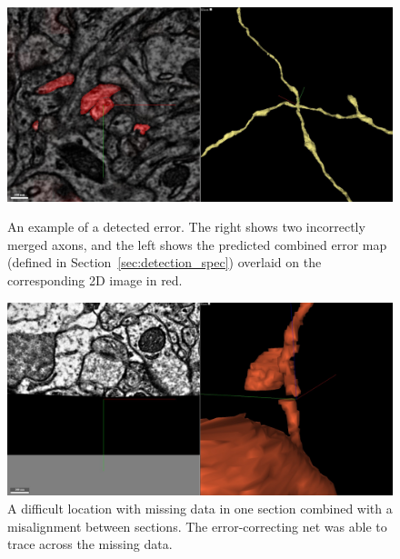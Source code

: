 \documentclass{article}
\begin{document}
\begin{figure}
	\begin{minipage}[t]{0.45\textwidth}
\begin{center}
	\includegraphics[width=1.0\linewidth]{x_error.jpg}
	\caption{An example of a detected error. The right shows two incorrectly
	merged axons, and the left shows the predicted combined error map (defined
	in Section~\ref{sec:detection_spec}) overlaid on the corresponding 2D image
	in red.}
    \label{fig:x_error}
\end{center}
\end{minipage}
\hfill
	\begin{minipage}[t]{0.45\textwidth}
\begin{center}
	\includegraphics[width=1.0\linewidth]{difficult.jpg}
	\caption{A difficult location with missing data in one section combined with a misalignment between sections. The error-correcting net was able to trace across the missing data.}
	\label{fig:difficult}
\end{center}
\end{minipage}
\end{figure}
\end{document}
